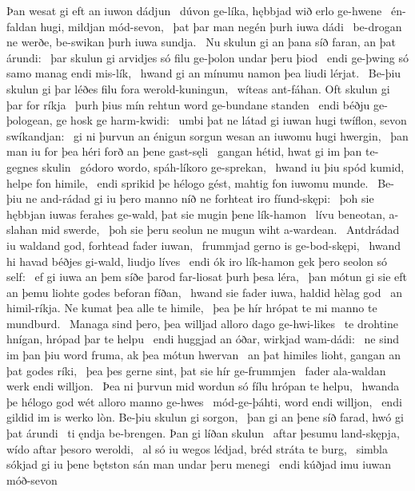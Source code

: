 Þan wesat gi eft an iuwon dádjun \hld\ dúvon ge-líka,
hębbjad wið erlo ge-hwene \hld\ én-faldan hugi,
mildjan mód-sevon, \hld\ þat þar man negén
þurh iuwa dádi \hld\ be-drogan ne werðe,
be-swikan þurh iuwa sundja. \hld\ Nu skulun gi an þana síð faran,
an þat árundi: \hld\ þar skulun gi arvidjes só filu
ge-þolon undar þeru þiod \hld\ endi ge-þwing só samo
manag endi mis-lík, \hld\ hwand gi an mínumu namon
þea liudi lérjat. \hld\ Be-þiu skulun gi þar léðes filu
fora werold-kuningun, \hld\ wíteas ant-fáhan.
Oft skulun gi þar for ríkja \hld\ þurh þius mín rehtun word
ge-bundane standen \hld\ endi béðju ge-þologean,
ge hosk ge harm-kwidi: \hld\ umbi þat ne látad gi iuwan hugi twíflon,
sevon swíkandjan: \hld\ gi ni þurvun an énigun sorgun wesan
an iuwomu hugi hwergin, \hld\ þan man iu for þea héri forð
an þene gast-sęli \hld\ gangan hétid,
hwat gi im þan te-gegnes skulin \hld\ gódoro wordo,
spáh-líkoro ge-sprekan, \hld\ hwand iu þiu spód kumid,
helpe fon himile, \hld\ endi sprikid þe hélogo gést,
mahtig fon iuwomu munde. \hld\ Be-þiu ne and-rádad gi iu þero manno níð
ne forhteat iro fíund-skępi: \hld\ þoh sie hębbjan iuwas ferahes ge-wald,
þat sie mugin þene lík-hamon \hld\ lívu beneotan,
a-slahan mid swerde, \hld\ þoh sie þeru seolun ne mugun
wiht a-wardean. \hld\ Antdrádad iu waldand god,
forhtead fader iuwan, \hld\ frummjad gerno
is ge-bod-skępi, \hld\ hwand hi havad béðjes gi-wald,
liudjo líves \hld\ endi ók iro lík-hamon
gek þero seolon só self: \hld\ ef gi iuwa an þem síðe þarod
far-liosat þurh þesa léra, \hld\ þan mótun gi sie eft an þemu liohte godes
beforan fíðan, \hld\ hwand sie fader iuwa,
haldid hèlag god \hld\ an himil-ríkja.
Ne kumat þea alle te himile, \hld\ þea þe hír hrópat te mi
manno te mundburd. \hld\ Managa sind þero,
þea willjad alloro dago ge-hwi-likes \hld\ te drohtine hnígan,
hrópad þar te helpu \hld\ endi huggjad an óðar,
wirkjad wam-dádi: \hld\ ne sind im þan þiu word fruma,
ak þea mótun hwervan \hld\ an þat himiles lioht,
gangan an þat godes ríki, \hld\ þea þes gerne sint,
þat sie hír ge-frummjen \hld\ fader ala-waldan
werk endi willjon. \hld\ Þea ni þurvun mid wordun só fílu
hrópan te helpu, \hld\ hwanda þe hélogo god
wét alloro manno ge-hwes \hld\ mód-ge-þáhti,
word endi willjon, \hld\ endi gildid im is werko lòn.
Be-þiu skulun gi sorgon, \hld\ þan gi an þene síð farad,
hwó gi þat árundi \hld\ ti ęndja be-brengen.
Þan gi líðan skulun \hld\ aftar þesumu land-skępja,
wído aftar þesoro weroldi, \hld\ al só iu wegos lédjad,
bréd stráta te burg, \hld\ simbla sókjad gi iu þene bętston sán
man undar þeru menegi \hld\ endi kúðjad imu iuwan móð-sevon
